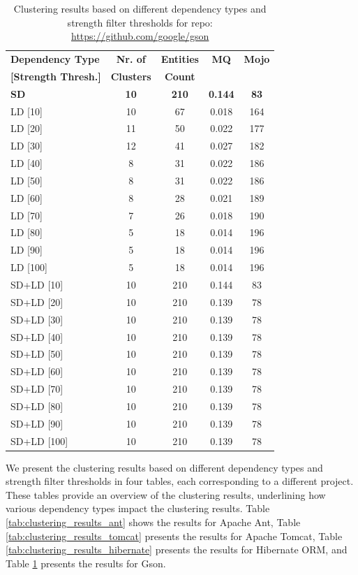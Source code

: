 \documentclass{ieeeaccess}
\begin{document}
\begin{table}
\caption{Clustering results based on different dependency types and strength filter thresholds for repo: \href{https://github.com/google/gson}{https://github.com/google/gson}}
\label{tab:clustering_results_gson}
\centering
\setlength{\tabcolsep}{3pt}
\begin{tabular}{|l|c|c|c|c|}
\hline
\textbf{Dependency Type} & \textbf{Nr. of} & \textbf{Entities} & \textbf{MQ} & \textbf{Mojo} \\
\textbf{[Strength Thresh.]} & \textbf{Clusters} & \textbf{Count} &  &  \\
\hline
\textbf{SD} & \textbf{10} & \textbf{210} & \textbf{0.144} & \textbf{83} \\
\hline
LD [10] & 10 & 67 & 0.018 & 164 \\
LD [20] & 11 & 50 & 0.022 & 177 \\
LD [30] & 12 & 41 & 0.027 & 182 \\
LD [40] & 8 & 31 & 0.022 & 186 \\
LD [50] & 8 & 31 & 0.022 & 186 \\
LD [60] & 8 & 28 & 0.021 & 189 \\
LD [70] & 7 & 26 & 0.018 & 190 \\
LD [80] & 5 & 18 & 0.014 & 196 \\
LD [90] & 5 & 18 & 0.014 & 196 \\
LD [100] & 5 & 18 & 0.014 & 196 \\
\hline
SD+LD [10] & 10 & 210 & 0.144 & 83 \\
SD+LD [20] & 10 & 210 & 0.139 & 78 \\
SD+LD [30] & 10 & 210 & 0.139 & 78 \\
SD+LD [40] & 10 & 210 & 0.139 & 78 \\
SD+LD [50] & 10 & 210 & 0.139 & 78 \\
SD+LD [60] & 10 & 210 & 0.139 & 78 \\
SD+LD [70] & 10 & 210 & 0.139 & 78 \\
SD+LD [80] & 10 & 210 & 0.139 & 78 \\
SD+LD [90] & 10 & 210 & 0.139 & 78 \\
SD+LD [100] & 10 & 210 & 0.139 & 78 \\
\hline
\end{tabular}
\end{table}



We present the clustering results based on different dependency types and strength filter thresholds in four tables, each corresponding to a different project. These tables provide an overview of the clustering results, underlining how various dependency types impact the clustering results. Table \ref{tab:clustering_results_ant} shows the results for Apache Ant, Table \ref{tab:clustering_results_tomcat} presents the results for Apache Tomcat, Table \ref{tab:clustering_results_hibernate} presents the results for Hibernate ORM, and Table \ref{tab:clustering_results_gson} presents the results for Gson.
\end{document}
